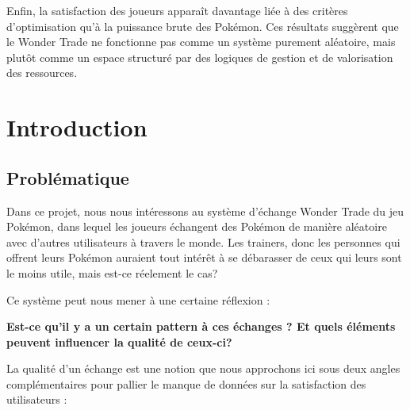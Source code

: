 \documentclass[mstat,12pt]{unswthesis}
\begin{document}
{\medskip}

Enfin, la satisfaction des joueurs apparaît davantage liée à des critères d'optimisation qu'à la puissance brute des Pokémon. Ces résultats suggèrent que le Wonder Trade ne fonctionne pas comme un système purement aléatoire, mais plutôt comme un espace structuré par des logiques de gestion et de valorisation des ressources.






\afterpreface





%
%






\chapter{Introduction}\label{introduction}

\section{Problématique}\label{probluxe9matique}

Dans ce projet, nous nous intéressons au système d'échange Wonder Trade
du jeu Pokémon, dans lequel les joueurs échangent des Pokémon de manière
aléatoire avec d'autres utilisateurs à travers le monde. Les trainers,
donc les personnes qui offrent leurs Pokémon auraient tout intérêt à se
débarasser de ceux qui leurs sont le moins utile, mais est-ce réelement
le cas?

Ce système peut nous mener à une certaine réflexion :

\bigskip

\textbf{Est-ce qu'il y a un certain pattern à ces échanges ? Et quels
éléments peuvent influencer la qualité de ceux-ci?}

\bigskip

La qualité d'un échange est une notion que nous approchons ici sous deux
angles complémentaires pour pallier le manque de données sur la
satisfaction des utilisateurs :\\
\bigskip
\end{document}
